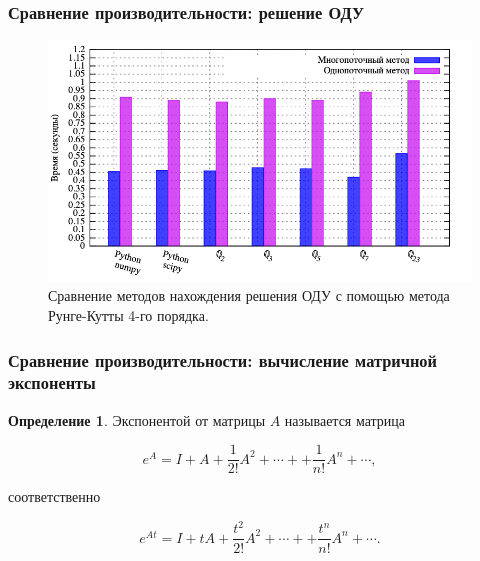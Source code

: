 \documentclass[10pt,professionalfont,utf8,presentation,compress]{beamer}
\theoremstyle{definition}
\newtheorem{defn}{Определение}
\theoremstyle{plain}
\begin{document}
\begin{frame}
\frametitle{Сравнение производительности: решение ОДУ}
\begin{figure}[H]
\centerline{\includegraphics[width=0.95\linewidth]{../gnuplot/multi/rk/plot.png}}
\caption{Сравнение методов нахождения решения ОДУ с помощью метода Рунге-Кутты 4-го порядка.}
\label{img:comp:ode:rk}
\end{figure}
\end{frame}




\begin{frame}
\frametitle{Сравнение производительности: вычисление матричной экспоненты}
\begin{defn}\label{def:exp}
Экспонентой от матрицы $A$ называется матрица

\begin{equation}
e^A=I+A+\frac{1}{2!}A^2+\cdots++\frac{1}{n!}A^n + \cdots,
\end{equation}

\noindent соответственно

\begin{equation}
e^{At}=I+tA+\frac{t^2}{2!}A^2+\cdots++\frac{t^n}{n!}A^n + \cdots.
\end{equation}
\end{defn}
\end{frame}
\end{document}
